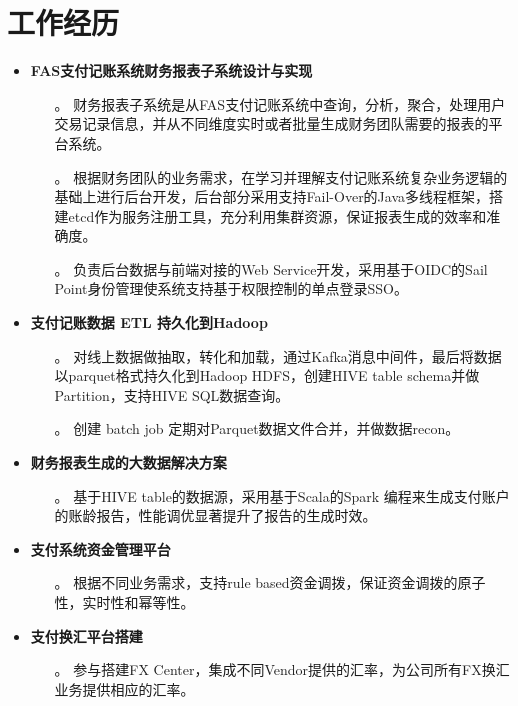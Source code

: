 \documentclass{resume}
\begin{document}
\section{工作经历}
\begin{itemize}
\item \textbf{FAS支付记账系统财务报表子系统设计与实现}
\begin{itemize}
\item[。] 财务报表子系统是从FAS支付记账系统中查询，分析，聚合，处理用户交易记录信息，并从不同维度实时或者批量生成财务团队需要的报表的平台系统。
\item[。] 根据财务团队的业务需求，在学习并理解支付记账系统复杂业务逻辑的基础上进行后台开发，后台部分采用支持Fail-Over的Java多线程框架，搭建etcd作为服务注册工具，充分利用集群资源，保证报表生成的效率和准确度。
\item[。] 负责后台数据与前端对接的Web Service开发，采用基于OIDC的Sail Point身份管理使系统支持基于权限控制的单点登录SSO。
\end{itemize}
\item \textbf{支付记账数据 ETL 持久化到Hadoop}
\begin{itemize}
\item[。] 对线上数据做抽取，转化和加载，通过Kafka消息中间件，最后将数据以parquet格式持久化到Hadoop HDFS，创建HIVE table schema并做Partition，支持HIVE SQL数据查询。
\item[。] 创建 batch job 定期对Parquet数据文件合并，并做数据recon。
\end{itemize}
\item \textbf{财务报表生成的大数据解决方案}
\begin{itemize}
\item[。] 基于HIVE table的数据源，采用基于Scala的Spark 编程来生成支付账户的账龄报告，性能调优显著提升了报告的生成时效。
\end{itemize}
\item \textbf{支付系统资金管理平台}
\begin{itemize}
\item[。] 根据不同业务需求，支持rule based资金调拨，保证资金调拨的原子性，实时性和幂等性。
\end{itemize}
\item \textbf{支付换汇平台搭建}
\begin{itemize}
\item[。] 参与搭建FX Center，集成不同Vendor提供的汇率，为公司所有FX换汇业务提供相应的汇率。

\end{itemize}
\end{itemize}
\end{document}
